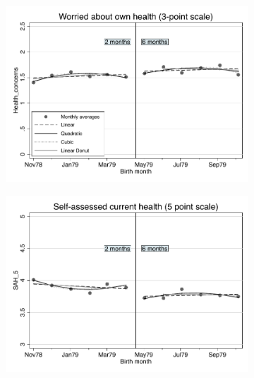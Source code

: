 \documentclass[a4paper ]{article}
\begin{document}
\newpage
\begin{figure}[p]
\begin{subfigure}[h]{0.48\textwidth}\centering
	\includegraphics[width=\textwidth]{../../analysis/graphs/SOEP/Health_concerns_RD.pdf}
\end{subfigure}
\quad
\begin{subfigure}[h]{0.48\textwidth}\centering
	\includegraphics[width=\textwidth]{../../analysis/graphs/SOEP/SAH_5_RD.pdf}
\end{subfigure}


\end{figure}
\end{document}
